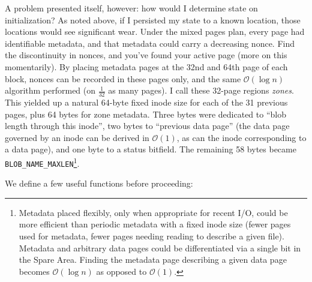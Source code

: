 \documentclass[letterpaper,10pt]{article}
\begin{document}
A problem presented itself, however: how would I determine state on
initialization? As noted above, if I persisted my state
to a known location, those locations would see significant wear. Under the
mixed pages plan, every page had identifiable metadata, and that metadata could
carry a decreasing nonce. Find the discontinuity in nonces, and you've found
your active page (more on this momentarily). By placing metadata pages at the
32nd and 64th page of each block, nonces can be recorded in these pages only, and
the same $\mathcal{O}(\log{}n)$ algorithm performed (on $\frac{1}{32}$ as many pages). I call these
32-page regions \textit{zones}. This yielded up a natural 64-byte fixed inode
size for each of the 31 previous pages, plus 64 bytes for zone metadata. Three
bytes were dedicated to ``blob length through this inode'', two bytes to
``previous data page'' (the data page governed by an inode can be derived in
$\mathcal{O}(1)$, as can the inode corresponding to a data
page), and one byte to a status bitfield. The remaining 58 bytes became
\texttt{BLOB\_NAME\_MAXLEN}\footnote{Metadata placed flexibly, only when
  appropriate for recent I/O, could be more efficient than periodic metadata
  with a fixed inode size (fewer pages used for metadata, fewer pages needing
  reading to describe a given file). Metadata and arbitrary data pages could be
  differentiated via a single bit in the Spare Area. Finding the metadata page
  describing a given data page becomes $\mathcal{O}(\log{}n)$ as opposed to
  $\mathcal{O}(1)$.}.

We define a few useful functions before proceeding:
\end{document}

